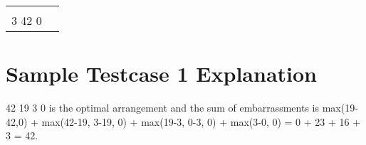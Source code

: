 \documentclass{report}
\def\arraystretch{1.4}
\begin{document}
\def\arraystretch{1}
\begin{tabularx}{\textwidth}{| >{\raggedright\arraybackslash}X | >{\raggedright\arraybackslash}X | }
    4 & 42 \\ 
    19 3 42 0 & \\ \hline
\end{tabularx}
\def\arraystretch{1.4}

\section*{Sample Testcase 1 Explanation}
42 19 3 0 is the optimal arrangement and the sum of embarrassments is max(19-42,0) + max(42-19, 3-19, 0) + max(19-3, 0-3, 0) + max(3-0, 0) = 0 + 23 + 16 + 3 = 42.

\pagebreak
\hfill \break \hfill \break
\end{document}
